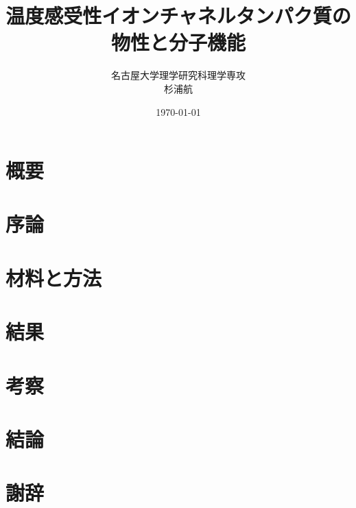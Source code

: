 \documentclass[a4paper, 14pt]{ltjsreport}
\title{温度感受性イオンチャネルタンパク質の物性と分子機能}
\author{名古屋大学理学研究科理学専攻\\杉浦航}
\date{\today}
\begin{document}
\maketitle

\chapter*{概要}


\tableofcontents
\clearpage

\chapter{序論}


\chapter{材料と方法}


\chapter{結果}


\chapter{考察}


\chapter{結論}


\chapter{謝辞}


\printbibliography[title=参考文献]
\end{document}
